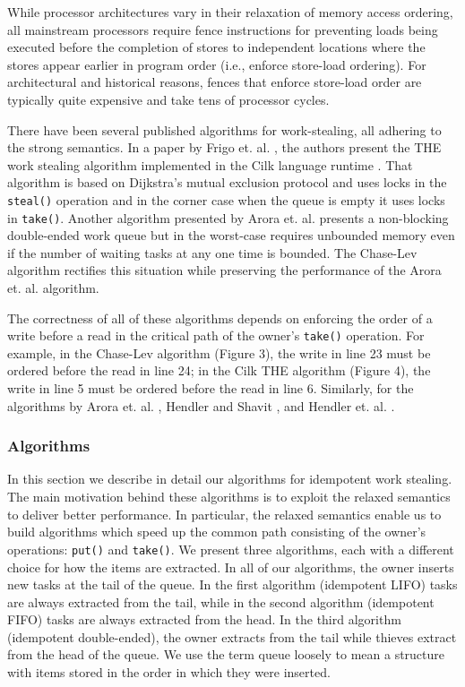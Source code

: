 While processor architectures vary in their relaxation of memory
access ordering, all mainstream processors require fence instructions
for preventing loads being executed before the completion of stores to
independent locations where the stores appear earlier in program order
(i.e., enforce store-load ordering). For architectural and historical
reasons, fences that enforce store-load order are typically quite
expensive and take tens of processor cycles.


There have been several published algorithms for work-stealing, all
adhering to the strong semantics. In a paper by Frigo
et. al. \cite{Frigo1998}, the authors present the THE work stealing
algorithm implemented in the Cilk language runtime
\cite{Blumofe1995}. That algorithm is based on Dijkstra's mutual
exclusion protocol and uses locks in the \lstinline!steal()!  operation
and in the corner case when the queue is empty it uses locks in
\lstinline!take()!. Another algorithm presented by Arora
et. al. \cite{Arora2001} presents a non-blocking double-ended work
queue but in the worst-case requires unbounded memory even if the
number of waiting tasks at any one time is bounded. The Chase-Lev
algorithm \cite{Chase2005} rectifies this situation while preserving
the performance of the Arora et. al. algorithm.

The correctness of all of these algorithms depends on enforcing the
order of a write before a read in the critical path of the owner's
\lstinline!take()! operation. For example, in the Chase-Lev algorithm
\cite{Chase2005} (Figure 3), the write in line 23 must be ordered
before the read in line 24; in the Cilk THE algorithm \cite{Frigo1998}
(Figure 4), the write in line 5 must be ordered before the read in
line 6. Similarly, for the algorithms by Arora
et. al. \cite{Arora2001}, Hendler and Shavit \cite{Hendler2002}, and
Hendler et. al. \cite{Hendler2006}.

\subsubsection{Algorithms}


In this section we describe in detail our algorithms for idempotent
work stealing. The main motivation behind these algorithms is to
exploit the relaxed semantics to deliver better performance. In
particular, the relaxed semantics enable us to build algorithms which
speed up the common path consisting of the owner's operations:
\lstinline!put()! and \lstinline!take()!. We present three algorithms,
each with a different choice for how the items are extracted. In all
of our algorithms, the owner inserts new tasks at the tail of the
queue. In the first algorithm (idempotent LIFO) tasks are always
extracted from the tail, while in the second algorithm (idempotent
FIFO) tasks are always extracted from the head. In the third algorithm
(idempotent double-ended), the owner extracts from the tail while
thieves extract from the head of the queue. We use the term queue
loosely to mean a structure with items stored in the order in which
they were inserted.

